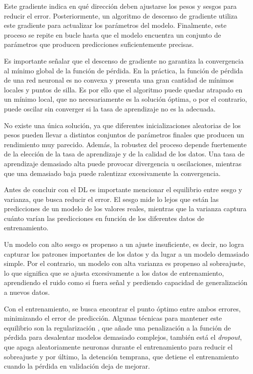 Este gradiente indica en qué dirección deben ajustarse los pesos y sesgos para reducir el error. Posteriormente, un algoritmo de descenso de gradiente utiliza este gradiente para actualizar los parámetros del modelo. Finalmente, este proceso se repite en bucle hasta que el modelo encuentra un conjunto de parámetros que producen predicciones suficientemente precisas.

Es importante señalar que el descenso de gradiente no garantiza la convergencia al mínimo global de la función de pérdida. En la práctica, la función de pérdida de una red neuronal es no convexa y presenta una gran cantidad de mínimos locales y puntos de silla. Es por ello que el algoritmo puede quedar atrapado en un mínimo local, que no necesariamente es la solución óptima, o por el contrario, puede oscilar sin converger si la tasa de aprendizaje no es la adecuada. 

No existe una única solución, ya que diferentes inicializaciones aleatorias de los pesos pueden llevar a distintos conjuntos de parámetros finales que producen un rendimiento muy parecido. Además, la robustez del proceso depende fuertemente de la elección de la tasa de aprendizaje y de la calidad de los datos. Una tasa de aprendizaje demasiado alta puede provocar divergencia u oscilaciones, mientras que una demasiado baja puede ralentizar excesivamente la convergencia.

Antes de concluir con el DL es importante mencionar el equilibrio entre sesgo y varianza, que busca reducir el error. El sesgo mide lo lejos que están las predicciones de un modelo de los valores reales, mientras que la varianza captura cuánto varían las predicciones en función de los diferentes datos de entrenamiento. 

Un modelo con alto sesgo es propenso a un ajuste insuficiente, es decir, no logra capturar los patrones importantes de los datos y da lugar a un modelo demasiado simple. Por el contrario, un modelo con alta varianza es propenso al sobreajuste, lo que significa que se ajusta excesivamente a los datos de entrenamiento, aprendiendo el ruido como si fuera señal y perdiendo capacidad de generalización a nuevos datos. 

Con el entrenamiento, se busca encontrar el punto óptimo entre ambos errores, minimizando el error de predicción. Algunas técnicas para mantener este equilibrio son la regularización \cite{ibm_regularizacion}, que añade una penalización a la función de pérdida para desalentar modelos demasiado complejos, también está el \emph{dropout}, que apaga aleatoriamente neuronas durante el entrenamiento para reducir el sobreajuste y por último, la detención temprana, que detiene el entrenamiento cuando la pérdida en validación deja de mejorar.

